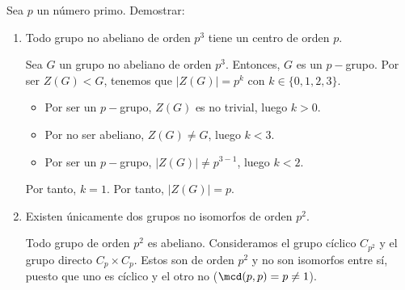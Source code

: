 \begin{ejercicio}\label{ej:6.17}
    Sea $p$ un número primo. Demostrar:
    \begin{enumerate}
        \item Todo grupo no abeliano de orden $p^3$ tiene un centro de orden $p$.
        
        Sea $G$ un grupo no abeliano de orden $p^3$. Entonces, $G$ es un $p-$grupo. Por ser $Z(G)<G$, tenemos que $|Z(G)|=p^k$ con $k\in \{0,1,2,3\}$.
        \begin{itemize}
            \item Por ser un $p-$grupo, $Z(G)$ es no trivial, luego $k>0$.
            \item Por no ser abeliano, $Z(G)\neq G$, luego $k<3$.
            \item Por ser un $p-$grupo, $|Z(G)|\neq p^{3-1}$, luego $k<2$.
        \end{itemize}
        Por tanto, $k=1$. Por tanto, $|Z(G)|=p$.
        \item Existen únicamente dos grupos no isomorfos de orden $p^2$.
        
        Todo grupo de orden $p^2$ es abeliano. 
        Consideramos el grupo cíclico $C_{p^2}$ y el grupo directo $C_p\times C_p$. Estos son de orden $p^2$ y no son isomorfos entre sí, puesto que uno es cíclico y el otro no ($\mcd(p,p)=p\neq 1$).


\end{enumerate}
\end{ejercicio}
